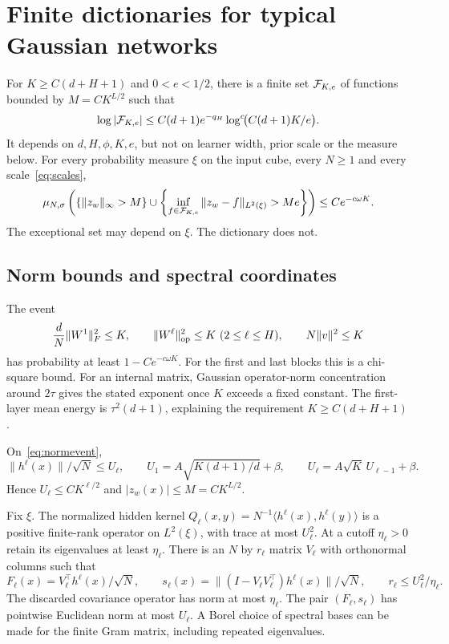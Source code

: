 \section{Finite dictionaries for typical Gaussian networks}
\label{sec:dictionary}
\begin{theorem}
\label{thm:dictionary}
For $K\ge C(d+H+1)$ and $0<e<1/2$, there is a finite set $\mathcal F_{K,e}$ of functions bounded by $M=C K^{L/2}$ such that
\begin{equation}
 \log|\mathcal F_{K,e}|
 \le C(d+1)e^{-q_H}\log^c\!\bigl(C(d+1)K/e\bigr).
 \label{eq:dictionary-size}
\end{equation}
It depends on $d,H,\phi,K,e$, but not on learner width, prior scale or the measure below. For every probability measure $\xi$ on the input cube, every $N\ge1$ and every scale~\eqref{eq:scales},
\begin{equation}
 \mu_{N,\sigma}\left(\{\|z_w\|_\infty>M\}\cup\left\{
   \inf_{f\in\mathcal F_{K,e}}\|z_w-f\|_{L^2(\xi)}>Me
   \right\}\right)
 \le C e^{-c\omega K}.
 \label{eq:dictionary-prob}
\end{equation}
The exceptional set may depend on $\xi$. The dictionary does not.
\end{theorem}

\subsection{Norm bounds and spectral coordinates}
The event
\begin{equation}
 \frac dN\|W^1\|_F^2\le K,\qquad
 \|W^\ell\|_{\mathrm{op}}^2\le K\ (2\le\ell\le H),\qquad
 N\|v\|^2\le K
 \label{eq:normevent}
\end{equation}
has probability at least $1-Ce^{-c\omega K}$. For the first and last blocks this is a chi-square bound. For an internal matrix, Gaussian operator-norm concentration around $2\tau$ gives the stated exponent once $K$ exceeds a fixed constant. The first-layer mean energy is $\tau^2(d+1)$, explaining the requirement $K\ge C(d+H+1)$.

On~\eqref{eq:normevent},
\[
 \|h^\ell(x)\|/\sqrt N\le U_\ell,\qquad
 U_1=A\sqrt{K(d+1)/d}+\beta,\qquad
 U_\ell=A\sqrt K\,U_{\ell-1}+\beta.
\]
Hence $U_\ell\le C K^{\ell/2}$ and $|z_w(x)|\le M=C K^{L/2}$.

Fix $\xi$. The normalized hidden kernel
$Q_\ell(x,y)=N^{-1}\langle h^\ell(x),h^\ell(y)\rangle$
is a positive finite-rank operator on $L^2(\xi)$, with trace at most $U_\ell^2$. At a cutoff $\eta_\ell>0$ retain its eigenvalues at least $\eta_\ell$. There is an $N$ by $r_\ell$ matrix $V_\ell$ with orthonormal columns such that
\begin{equation}
 F_\ell(x)=V_\ell^\top h^\ell(x)/\sqrt N,\qquad
 s_\ell(x)=\|(I-V_\ell V_\ell^\top)h^\ell(x)\|/\sqrt N,\qquad
 r_\ell\le U_\ell^2/\eta_\ell.
 \label{eq:state}
\end{equation}
The discarded covariance operator has norm at most $\eta_\ell$.
The pair $(F_\ell,s_\ell)$ has pointwise Euclidean norm at most $U_\ell$.
A Borel choice of spectral bases can be made for the finite Gram matrix, including repeated eigenvalues.

